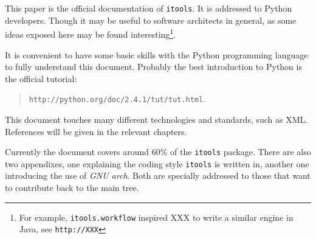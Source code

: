 This paper is the official documentation of {\tt itools}. It is
addressed to Python developers. Though it may be useful to software
architects in general, as some ideas exposed here may be found
interesting\footnote{For example, {\tt itools.workflow} inspired XXX
to write a similar engine in Java, see {\tt http://XXX}}.

It is convenient to have some basic skills with the Python programming
language to fully understand this document. Probably the best introduction
to Python is the official tutorial:

\begin{quote}
  {\tt http://python.org/doc/2.4.1/tut/tut.html}.
\end{quote}

This document touches many different technologies and standards, such as XML.
References will be given in the relevant chapters.

Currently the document covers around 60\% of the {\tt itools} package.
There are also two appendixes, one explaining the coding style {\tt itools}
is written in, another one introducing the use of {\em GNU arch}. Both are
specially addressed to those that want to contribute back to the main tree.
